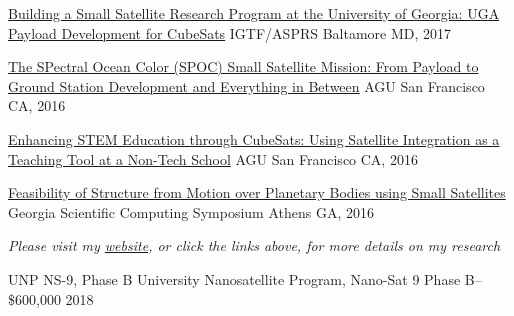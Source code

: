 \documentclass[10pt,a4paper]{article}
\begin{document}
\headedsection
  {{\color{bluegreen} \faTelevision} \href{http://smallsat.uga.edu/images/documents/posters/2017-ASPRS-IGTF-2-PayloadDevelopment.pdf}{Building a Small Satellite Research Program at the University of Georgia: UGA Payload Development for CubeSats}}{%
  \headedsubsection
    {IGTF/ASPRS}
    {Baltamore MD, 2017}
    {}
}

\headedsection
  {{\color{bluegreen} \faMapO} \href{http://smallsat.uga.edu/images/documents/posters/AGU2016-SPOC-final2.pdf}{The SPectral Ocean Color (SPOC) Small Satellite Mission: From Payload to Ground Station Development and Everything in Between}}{%
  \headedsubsection
    {AGU}
    {San Francisco CA, 2016}
    {}
}

\headedsection
  {{\color{bluegreen} \faMapO} \href{http://smallsat.uga.edu/images/documents/posters/AGU2016-SSRL-final3.pdf}{Enhancing STEM Education through CubeSats: Using Satellite Integration as a Teaching Tool at a Non-Tech School}}{%
  \headedsubsection
    {AGU}
    {San Francisco CA, 2016}
    {}
}

\headedsection
  {{\color{bluegreen} \faMapO} \href{http://smallsat.uga.edu/images/documents/posters/2017-GeorgiaScientificComputingSymposium\%20final.pdf}{Feasibility of Structure from Motion over Planetary Bodies using Small Satellites}}{%
  \headedsubsection
    {Georgia Scientific Computing Symposium}
    {Athens GA, 2016}
    {}
}

\begin{center}
  \emph{\small Please visit my \href{http://calebadams.space}{website}, or click the links above, for more details on my research}
\end{center}


\spacedhrule{0.5em}{-0.4em}

\vspace{-0.2em}

\headedsection
  {{UNP NS-9, Phase B}}
  {%
  \headedsubsection
    {University Nanosatellite Program, Nano-Sat 9 Phase B-- \$600,000}
    {2018}
    {}
}
\end{document}
